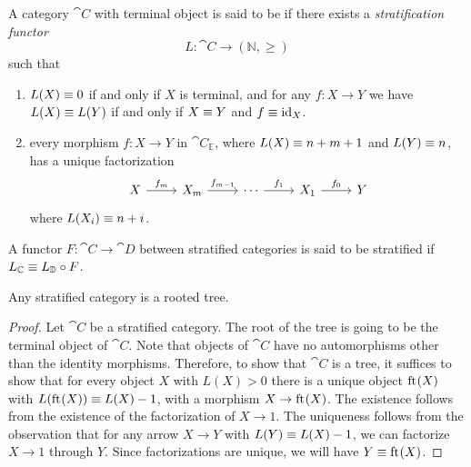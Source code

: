 \begin{defn}
A category $\cat{C}$ with terminal object is said to be  if there exists a 
\emph{stratification functor}
\begin{equation*}
L : \cat{C}\to (\mathbb{N},\geq)
\end{equation*}
such that
\begin{enumerate}
\item $L(X)\equiv 0$ if and only if $X$ is terminal, and for any $f:X\to Y$ we have
$L(X)\equiv L(Y)$ if and only if $X\equiv Y$ and $f\equiv{\mathrm{id}_{X}}$. 
\item every morphism $f:X\to Y$ in $\cat{C}_\mathbb{E}$, where $L(X)\equiv
n+m+1$ and $L(Y)\equiv n$, has a unique factorization 
\begin{equation*}
\begin{tikzcd}
X \arrow[r,"f_m"] & X_m \arrow[r,"f_{m-1}"] & \cdots \arrow[r,"f_1"] & X_1 \arrow[r,"f_0"] & Y
\end{tikzcd}
\end{equation*}
where $L(X_i)\equiv n+i$.
\end{enumerate}
A functor $F:\cat{C}\to\cat{D}$ between stratified categories is said to be stratified 
if $L_{\mathbb{C}}\equiv L_{\mathbb{D}}\circ F$. 
\end{defn}


\begin{lem}
Any stratified category is a rooted tree.
\end{lem}

\begin{proof}
Let $\cat{C}$ be a stratified category. The root of the tree is going to be the terminal
object of $\cat{C}$. Note that objects of $\cat{C}$ have no automorphisms other
than the identity morphisms. Therefore, to show that $\cat{C}$ is a tree,
it suffices to show that for every object $X$ with $L(X)>0$ there is
a unique object $\mathrm{ft}_{}(X)$ with $L(\mathrm{ft}_{}(X))\equiv L(X)-1$, with a morphism $X\to \mathrm{ft}_{}(X)$.
The existence follows from the existence of the factorization of $X\to 1$. The 
uniqueness follows from the observation that for any arrow
$X\to Y$ with $L(Y)\equiv L(X)-1$, we can factorize $X\to 1$ through $Y$. Since
factorizations are unique, we will have $Y\equiv \mathrm{ft}_{}(X)$. 
\end{proof}

